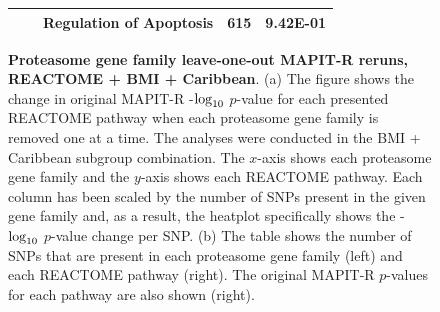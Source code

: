 \documentclass[12pt,a4paper]{article}
\def\log{{\rm log}}
\begin{document}
\begin{figure}[ht]
{{\begin{tabular}{cc|ccc}
 & & Regulation of Apoptosis & 615 & 9.42E-01 \\
  \hline
\end{tabular}}}
\caption[TBD]{\textbf{Proteasome gene family leave-one-out MAPIT-R reruns, REACTOME + BMI + Caribbean}. (a) The figure shows the change in original MAPIT-R -$\log_{10}$ $p$-value for each presented REACTOME pathway when each proteasome gene family is removed one at a time. The analyses were conducted in the BMI + Caribbean subgroup combination. The $x$-axis shows each proteasome gene family and the $y$-axis shows each REACTOME pathway. Each column has been scaled by the number of SNPs present in the given gene family and, as a result, the heatplot specifically shows the -$\log_{10}$ $p$-value change per SNP. (b) The table shows the number of SNPs that are present in each proteasome gene family (left) and each REACTOME pathway (right). The original MAPIT-R $p$-values for each pathway are also shown (right).}
\label{InterPath-Supp-Figure-Prot-Heatplots-Caribbean}
\end{figure}
\clearpage
\addtocounter{figure}{-1}
\addtocounter{CharNumber5}{1}
\end{document}
